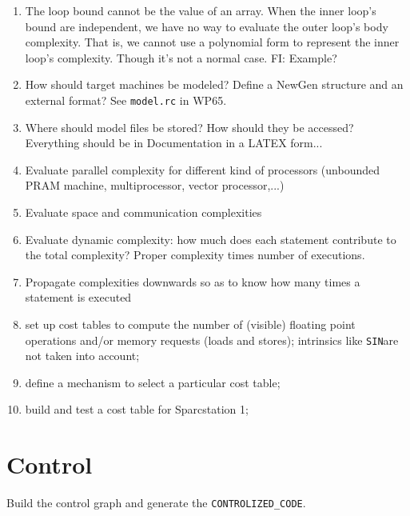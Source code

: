 \begin{enumerate}

  \item The loop bound cannot be the value of an array.
	When the inner loop's bound are independent, we have no way to
	evaluate the outer loop's body complexity.
	That is, we cannot use a polynomial form to represent the inner
	loop's complexity. 
	Though it's not a normal case. FI: Example?

  \item How should target machines be modeled? Define a NewGen structure
	and an external format? See \verb+model.rc+ in WP65.

  \item Where should model files be stored? How
	should they be accessed? Everything should be in Documentation
	in a LATEX form...

  \item Evaluate parallel complexity for different kind of processors
	(unbounded PRAM machine, multiprocessor, vector processor,...)

  \item Evaluate space and communication complexities

  \item Evaluate dynamic complexity: how much does each statement contribute
	to the total complexity? Proper complexity times number of executions.

  \item Propagate complexities downwards so as to know how many times a
	statement is executed

  \item set up cost tables to compute the number of (visible) floating point
	operations and/or memory requests (loads and stores); intrinsics
	like \verb+SIN+are not taken into account;

  \item define a mechanism to select a particular cost table;

  \item build and test a cost table for Sparcstation 1;

\end{enumerate}

\section{Control}

Build the control graph and generate the \verb+CONTROLIZED_CODE+.

